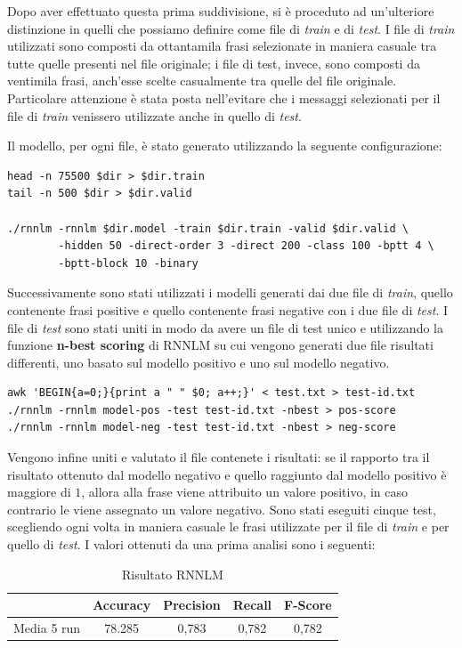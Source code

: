 \documentclass[a4paper,12pt,openright,twoside]{report}
\theoremstyle{definition}
\begin{document}
Dopo aver effettuato questa prima suddivisione, si è proceduto ad un'ulteriore
distinzione in quelli che possiamo definire come file di \emph{train} e di \emph{test}.
I file di \emph{train} utilizzati sono composti da ottantamila frasi selezionate in maniera casuale tra tutte quelle presenti nel file originale;
i file di test, invece, sono composti da ventimila frasi,
anch'esse scelte casualmente tra quelle del file originale.
Particolare attenzione è stata posta nell'evitare che i messaggi selezionati per il file di \emph{train}
venissero utilizzate anche in quello di \emph{test}.

Il modello, per ogni file, è stato generato utilizzando la seguente configurazione:

\begin{verbatim}
head -n 75500 $dir > $dir.train
tail -n 500 $dir > $dir.valid

./rnnlm -rnnlm $dir.model -train $dir.train -valid $dir.valid \
        -hidden 50 -direct-order 3 -direct 200 -class 100 -bptt 4 \
        -bptt-block 10 -binary
\end{verbatim}

Successivamente sono stati utilizzati i modelli generati dai due file di \emph{train}, 
quello contenente
frasi positive e quello contenente frasi negative con i due file di \emph{test}. 
I file di \emph{test}
sono stati uniti in modo da avere un file di test unico e utilizzando la funzione 
\textbf{n-best scoring} di RNNLM
su cui vengono generati due file risultati differenti, uno basato sul
modello positivo e uno sul modello negativo.
\begin{verbatim}
awk 'BEGIN{a=0;}{print a " " $0; a++;}' < test.txt > test-id.txt
./rnnlm -rnnlm model-pos -test test-id.txt -nbest > pos-score
./rnnlm -rnnlm model-neg -test test-id.txt -nbest > neg-score
\end{verbatim}

Vengono infine uniti e valutato il file contenete i risultati: se il rapporto tra il 
risultato ottenuto
dal modello negativo e quello raggiunto dal modello positivo è maggiore di $1$,
allora alla frase viene attribuito
un valore positivo, in caso contrario le viene assegnato
un valore negativo.
Sono stati eseguiti cinque test, 
scegliendo ogni volta in maniera casuale le frasi utilizzate per il file di \emph{train} e 
per quello di \emph{test}. I valori ottenuti da una prima analisi sono i seguenti:
\begin{table}[H]
\begin{center}
\begin{tabular}{|c|c|c|c|c|}
\hline
 & Accuracy & Precision & Recall & F-Score\\
\hline
Media 5 run & 78.285 &  0,783 & 0,782 & 0,782 \\
\hline
\end{tabular}
\end{center}
\caption{Risultato RNNLM}
\label{tab:rposNeg}
\end{table}
\end{document}
